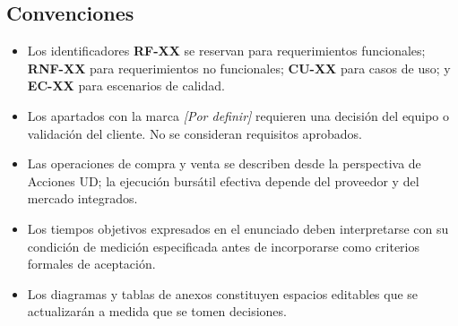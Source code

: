 \documentclass[11pt,a4paper,oneside]{article}
\newcommand{\pendiente}[1]{\textcolor{grisTexto}{\emph{[#1]}}}
\begin{document}
\subsection{Convenciones}
\begin{itemize}
    \item Los identificadores \textbf{RF-XX} se reservan para requerimientos funcionales; \textbf{RNF-XX} para requerimientos no funcionales; \textbf{CU-XX} para casos de uso; y \textbf{EC-XX} para escenarios de calidad.
    \item Los apartados con la marca \pendiente{Por definir} requieren una decisión del equipo o validación del cliente. No se consideran requisitos aprobados.
    \item Las operaciones de compra y venta se describen desde la perspectiva de Acciones UD; la ejecución bursátil efectiva depende del proveedor y del mercado integrados.
    \item Los tiempos objetivos expresados en el enunciado deben interpretarse con su condición de medición especificada antes de incorporarse como criterios formales de aceptación.
    \item Los diagramas y tablas de anexos constituyen espacios editables que se actualizarán a medida que se tomen decisiones.
\end{itemize}
\end{document}

